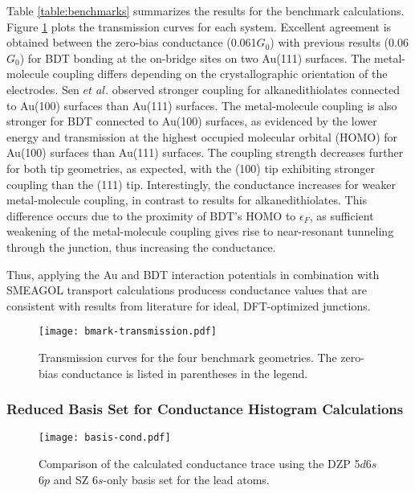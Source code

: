 \documentclass[10pt]{report}  %
\begin{document}
Table \ref{table:benchmarks} summarizes the results for the benchmark calculations. Figure \ref{fig:benchmark-tr} plots the transmission curves for each system.  Excellent agreement is obtained between the zero-bias conductance (0.061$G_{0}$) with previous results (0.06$G_{0}$) \cite{Toher:2008} for BDT bonding at the on-bridge sites on two Au(111) surfaces.  The metal-molecule coupling differs depending on the crystallographic orientation of the electrodes. Sen $et$ $al.$ \cite{Sen:2010} observed stronger coupling for alkanedithiolates connected to Au(100) surfaces than Au(111) surfaces. The metal-molecule coupling is also stronger for BDT connected to Au(100) surfaces, as evidenced by the lower energy and transmission at the highest occupied molecular orbital (HOMO)  for Au(100) surfaces than Au(111) surfaces.  The coupling strength decreases further for both tip geometries, as expected, with the (100) tip exhibiting stronger coupling than the (111) tip.  Interestingly, the conductance increases for weaker metal-molecule coupling, in contrast to results for alkanedithiolates.\cite{Sen:2010}  This difference occurs due to the proximity of BDT's HOMO to $\epsilon_{F}$, as sufficient weakening of the metal-molecule coupling gives rise to near-resonant tunneling through the junction, thus increasing the conductance. 

Thus, applying the Au and BDT interaction potentials in combination with SMEAGOL transport calculations producess conductance values that are consistent with results from literature for ideal, DFT-optimized junctions.

\begin{figure}[t]
	\centering
	\texttt{[image: bmark-transmission.pdf]}
	\caption{ Transmission curves for the four benchmark geometries. The zero-bias conductance is listed in parentheses in the legend. }
	\label{fig:benchmark-tr}
\end{figure}

\subsubsection{Reduced Basis Set for Conductance Histogram Calculations} 

\begin{figure}[t]
	\centering
	\texttt{[image: basis-cond.pdf]}
	\caption{Comparison of the calculated conductance trace using the DZP 5$d$6$s$6$p$ and SZ 6$s$-only basis set for the lead atoms.}
	\label{fig:basis-cond}
\end{figure}
\end{document}
